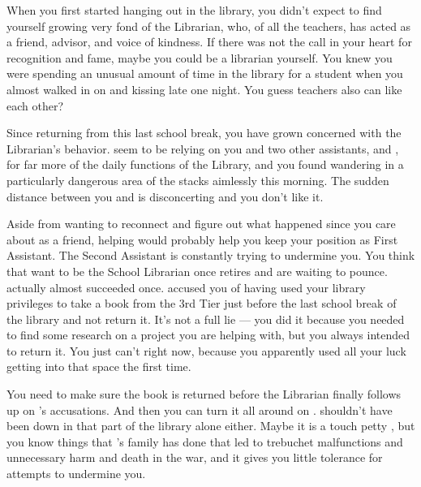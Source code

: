\documentclass[char]{GL2020}
\begin{document}
When you first started hanging out in the library, you didn’t expect to find yourself growing very fond of the Librarian, \cLibrarian{\intro} who, of all the teachers, has acted as a friend, advisor, and voice of kindness. If there was not the call in your heart for recognition and fame, maybe you could be a librarian yourself. You knew you were spending an unusual amount of time in the library for a student when you almost walked in on \cInterpol{\full} and \cLibrarian{} kissing late one night. You guess teachers also can like each other?

 Since returning from this last school break, you have grown concerned with the Librarian’s behavior. \cLibrarian{\They} seem\cLibrarian{\verbs} to be relying on you and \cLibrarian{\their} two other assistants, \cPresident{\full} and \cLibAssist{\full}, for far more of the daily functions of the Library, and you found \cLibrarian{\them} wandering in a particularly dangerous area of the stacks aimlessly this morning.  The sudden distance between you and \cLibrarian{} is disconcerting and you don’t like it. 

Aside from wanting to reconnect and figure out what happened since you care about \cLibrarian{} as a friend, helping  \cLibrarian{\them} would probably help you keep your position as First Assistant.  The Second Assistant \cLibAssist{\full} is constantly trying to undermine you. You think that \cLibAssist{\they} want\cLibAssist{\verbs} to be the School Librarian once \cLibrarian{} retires and are waiting to pounce. \cLibAssist{\They} actually almost succeeded once. \cLibAssist{} accused you of having used your library privileges to take a book from the 3rd Tier just before the last school break of the library and not return it. It's not a full lie — you did it because you needed to find some research on a project you are helping \cFlowPriest{\full} with, but you always intended to return it. You just can’t right now, because you apparently used all your luck getting into that space the first time. 

You need to make sure the book is returned before the Librarian finally follows up on \cLibAssist{}’s accusations. And then you can turn it all around on \cLibAssist{}. \cLibAssist{\They} shouldn’t have been down in that part of the library alone either. Maybe it is a touch petty , but you know things that \cLibAssist{}’s family has done that led to trebuchet malfunctions and unnecessary harm and death in the war, and it gives you little tolerance for \cLibAssist{\their} attempts to undermine you. 
\end{document}
